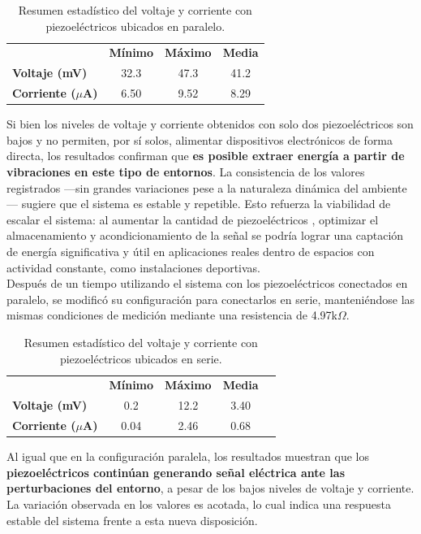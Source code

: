 \documentclass{article}
\begin{document}
\begin{table}[H]
\centering
\begin{tabular}{lccc}
\textbf{ } & \textbf{Mínimo} & \textbf{Máximo} & \textbf{Media} \\
\textbf{Voltaje (mV)} & 32.3 & 47.3 & 41.2 \\
\textbf{Corriente ($\mu$A)} & 6.50 & 9.52 & 8.29 \\
\end{tabular}
\caption{Resumen estadístico del voltaje y corriente con piezoeléctricos ubicados en paralelo.}
\label{tab:resumen_voltaje}
\end{table}

Si bien los niveles de voltaje y corriente obtenidos con solo dos piezoeléctricos son bajos y no permiten, por sí solos, alimentar dispositivos electrónicos de forma directa, los resultados confirman que \textbf{es posible extraer energía a partir de vibraciones en este tipo de entornos}. La consistencia de los valores registrados —sin grandes variaciones pese a la naturaleza dinámica del ambiente— sugiere que el sistema es estable y repetible. Esto refuerza la viabilidad de escalar el sistema: al aumentar la cantidad de piezoeléctricos , optimizar el almacenamiento y acondicionamiento de la señal se podría lograr una captación de energía significativa y útil en aplicaciones reales dentro de espacios con actividad constante, como instalaciones deportivas.\\

Después de un tiempo utilizando el sistema con los piezoeléctricos conectados en paralelo, se modificó su configuración para conectarlos en serie, manteniéndose las mismas condiciones de medición mediante una resistencia de 4.97k$\Omega$.

\begin{table}[H]
\centering
\begin{tabular}{lcccc}
\textbf{ } & \textbf{Mínimo} & \textbf{Máximo} & \textbf{Media} \\
\textbf{Voltaje (mV)} & 0.2 & 12.2 & 3.40\\
\textbf{Corriente ($\mu$A)} & 0.04 & 2.46 & 0.68\\
\end{tabular}
\caption{Resumen estadístico del voltaje y corriente con piezoeléctricos ubicados en serie.}
\label{tab:resumen_voltaje}
\end{table}

Al igual que en la configuración paralela, los resultados muestran que los \textbf{piezoeléctricos continúan generando señal eléctrica ante las perturbaciones del entorno}, a pesar de los bajos niveles de voltaje y corriente. La variación observada en los valores es acotada, lo cual indica una respuesta estable del sistema frente a esta nueva disposición.\\
\\
\end{document}

